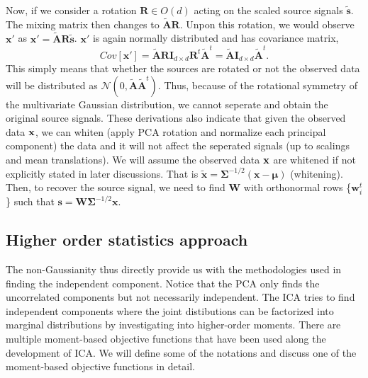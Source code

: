 \documentclass[aps,prl,preprint,superscriptaddress]{revtex4-2}
\begin{document}
Now, if we consider a rotation $\mathbf{R} $$\in O(d)$ acting on the scaled source signals $\mathbf{\tilde{s}}$. The mixing matrix then changes to $\tilde{\mathbf{A}}\mathbf{R}$. Unpon this rotation, we would observe $\mathbf{x'}$ as $\mathbf{x'} = \tilde{\mathbf{A}}\mathbf{R}\tilde{\mathbf{s}}$. $\mathbf{x'}$ is again normally distributed and has covariance matrix,
\begin{equation}
Cov[\mathbf{x'}] = \tilde{\mathbf{A}}\mathbf{R}\mathbf{I}_{d\times d}\mathbf{R}^{t}\tilde{\mathbf{A}}^{t} = \tilde{\mathbf{A}}\mathbf{I}_{d\times d}\tilde{\mathbf{A}}^{t}. 
\end{equation} This simply means that whether the sources are rotated or not the observed data will be distributed as $\mathcal{N}(0, \tilde{\mathbf{A}}\tilde{\mathbf{A}}^{t})$. Thus, because of the rotational symmetry of the multivariate Gaussian distribution, we cannot seperate and obtain the original source signals. These derivations also indicate that given the observed data $\bf{x}$, we can whiten (apply PCA rotation and normalize each principal component) the data and it will not affect the seperated signals (up to scalings and mean translations). We will assume the observed data $\bf{x}$ are whitened if not explicitly stated in later discussions. That is $\tilde{\mathbf{x}} = \mathbf{\Sigma}^{-1/2}(\mathbf{x}-\mathbf{\mu})$ (whitening). Then, to recover the source signal, we need to find $\mathbf{W}$ with orthonormal rows \{$\mathbf{w}_{i}^{t}$\} such that $\mathbf{s} = \mathbf{W}\mathbf{\Sigma}^{-1/2}\mathbf{x}$. 

\subsection{Higher order statistics approach}

The non-Gaussianity thus directly provide us with the methodologies used in finding the independent component. Notice that the PCA only finds the uncorrelated components but not necessarily independent. The ICA tries to find independent components where the joint distibutions can be factorized into marginal distributions by investigating into higher-order moments. There are multiple moment-based objective functions that have been used along the development of ICA. We will define some of the notations and discuss one of the moment-based objective functions in detail.  
\end{document}
